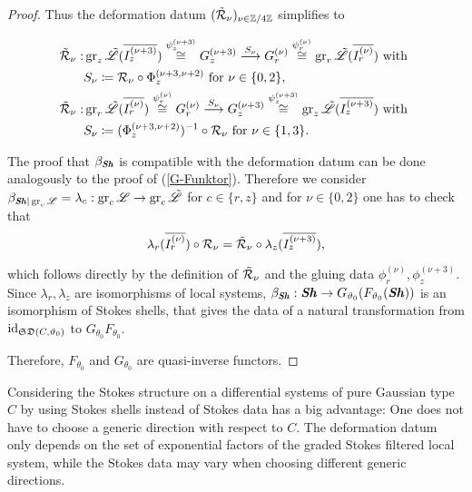\begin{proof}
Thus the deformation datum $(\tilde{\mathcal{R}}_\nu)_{\nu \in \mathbb{Z}/4\mathbb{Z}}$ simplifies to 

\begin{align*}
        \tilde{\mathcal{R}}_\nu: &\operatorname{gr}_z\tilde{\mathscr{L}}(\overline{I_z^{(\nu+3)}}) \overset{\psi_z^{(\nu+3)}}{\cong} G_z^{(\nu + 3)} \overset{S_\nu}{\longrightarrow} G_r^{(\nu)} \overset{\psi_r^{(\nu)}}{\cong} \operatorname{gr}_r\tilde{\mathscr{L}}(\overline{I_r^{(\nu)}}) \text{ with } \\
        &S_\nu \coloneqq \mathcal{R}_\nu \circ \Phi_{z}^{(\nu+3, \nu+2)} \text{ for } \nu \in \{0,2\}, \\
        \tilde{\mathcal{R}}_\nu: &\operatorname{gr}_r\tilde{\mathscr{L}}(\overline{I_r^{(\nu)}}) \overset{\psi_r^{(\nu)}}{\cong} G_r^{(\nu)} \overset{S_\nu}{\longrightarrow} G_z^{(\nu+3)} \overset{\psi_z^{(\nu+3)}}{\cong} \operatorname{gr}_z\tilde{\mathscr{L}}(\overline{I_z^{(\nu+3)}}) \text{ with } \\
        & S_\nu \coloneqq (\Phi_z^{(\nu+3,\nu+2)})^{-1} \circ \mathcal{R}_\nu \text{ for } \nu \in \{1,3\}.
\end{align*}

The proof that $\beta_{\bm{\mathit{Sh}}}$ is compatible with the deformation datum can be done analogously to the proof of (\ref{G-Funktor}). Therefore we consider $\beta_{\bm{\mathit{Sh}}\vert \operatorname{gr}_c\mathscr{L}}= \lambda_c : \operatorname{gr}_c\mathscr{L} \to \operatorname{gr}_c\tilde{\mathscr{L}}$ for $c \in \{r,z\}$ and for $\nu \in \{0,2\}$ one has to check that 
\[\lambda_r(\overline{I_r^{(\nu)}}) \circ \mathcal{R}_\nu = \tilde{\mathcal{R}}_\nu \circ \lambda_z(\overline{I_z^{(\nu+3)}}),\]

which follows directly by the definition of $\tilde{\mathcal{R}}_\nu$ and the gluing data $\phi_r^{(\nu)}, \phi_z^{(\nu+3)}$. Since $\lambda_r,\lambda_z$ are isomorphisms of local systems, $\beta_{\bm{\mathit{Sh}}}: \bm{\mathit{Sh}} \to G_{\vartheta_0}(F_{\vartheta_0}(\bm{\mathit{Sh}}))$ is an isomorphism of Stokes shells, that gives the data of a natural transformation from $\operatorname{id}_{\mathfrak{SD}(C,\vartheta_0)}$ to $G_{\theta_0}F_{\theta_0}$.
~\newline

Therefore, $F_{\theta_0}$ and $G_{\theta_0}$ are quasi-inverse functors.
\end{proof}




Considering the Stokes structure on a differential systems of pure Gaussian type $C$ by using Stokes shells instead of Stokes data has a big advantage: One does not have to choose a generic direction with respect to $C$. The deformation datum only depends on the set of exponential factors of the graded Stokes filtered local system, while the Stokes data may vary when choosing different generic directions. 

